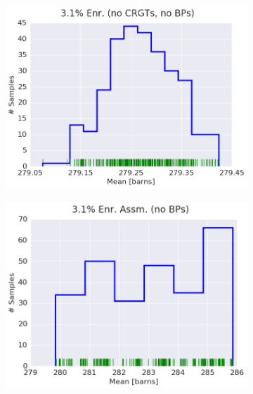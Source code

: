 \begin{figure}[h!]
\centering
\begin{subfigure}{0.5\textwidth}
  \centering
  \includegraphics[width=\linewidth]{figures/patterns/assm-3.1-inf/hist-kde-rug/assm-31-inf-fiss-2}
  \caption{}
  \label{fig:chap9-hist-assm-3.1-inf-fiss}
\end{subfigure}%
\begin{subfigure}{0.5\textwidth}
  \centering
  \includegraphics[width=\linewidth]{figures/patterns/assm-3.1/hist-kde-rug/assm-31-fiss-2}
  \caption{}
  \label{fig:chap9-hist-assm-3.1-fiss}
\end{subfigure}
\begin{subfigure}{0.5\textwidth}

\end{subfigure}
\end{figure}
